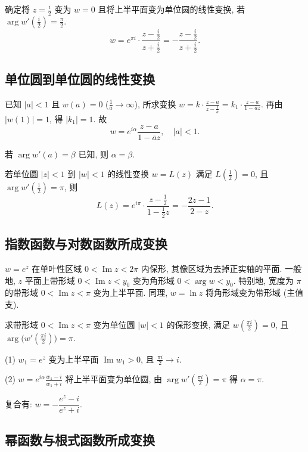\documentclass[theorem=false,mathfont=none,openany,sub3section]{easybook}
\begin{document}
\begin{example}
  确定将 $z=\frac{i}{2}$ 变为 $w=0$ 且将上半平面变为单位圆的线性变换, 若 $\arg w'(\frac{i}{2})=\frac{\pi}{2}$.
  \[
  w=e^{\pi i}\cdot\frac{z-\frac{i}{2}}{z+\frac{i}{2}}=-\frac{z-\frac{i}{2}}{z+\frac{i}{2}}.
  \]
\end{example}

\subsection{单位圆到单位圆的线性变换}

已知 $|a|<1$ 且 $w(a)=0$ ($\frac{1}{\overline{a}}\to\infty$),
所求变换 $w=k\cdot\frac{z-a}{z-\frac{1}{\overline{a}}}=k_{1}\cdot\frac{z-a}{1-\overline{a}z}$.
再由 $|w(1)|=1$, 得 $|k_{1}|=1$. 故
\[
w=e^{i\alpha}\frac{z-a}{1-\overline{a}z},\quad |a|<1.
\]

若 $\arg w'(a)=\beta$ 已知, 则 $\alpha=\beta$.

\begin{example}
  若单位圆 $|z|<1$ 到 $|w|<1$ 的线性变换 $w=L(z)$ 满足 $L(\frac{1}{2})=0$, 且 $\arg w'(\frac{1}{2})=\pi$, 则
  \[
  L(z)=e^{i\pi}\cdot\frac{z-\frac{1}{2}}{1-\frac{1}{2}z}=-\frac{2z-1}{2-z}.
  \]
\end{example}

\subsection{指数函数与对数函数所成变换}

$w=e^{z}$ 在单叶性区域 $0<\operatorname{Im}z<2\pi$ 内保形, 其像区域为去掉正实轴的平面.
一般地, $z$ 平面上带形域 $0<\operatorname{Im}z<y_{0}$ 变为角形域 $0<\arg w<y_{0}$.
特别地, 宽度为 $\pi$ 的带形域 $0<\operatorname{Im}z<\pi$ 变为上半平面.
同理, $w=\ln z$ 将角形域变为带形域 (主值支).

\begin{example}
  求带形域 $0<\operatorname{Im}z<\pi$ 变为单位圆 $|w|<1$ 的保形变换, 满足 $w(\frac{\pi i}{2})=0$, 且 $\arg\bigl(w'(\frac{\pi i}{2})\bigr)=\pi$.

  (1) $w_{1}=e^{z}$ 变为上半平面 $\operatorname{Im}w_{1}>0$, 且 $\frac{\pi i}{2}\to i$.\par
  (2) $w=e^{i\alpha}\frac{w_{1}-i}{w_{1}+i}$ 将上半平面变为单位圆, 由 $\arg w'(\frac{\pi i}{2})=\pi$ 得 $\alpha=\pi$.\par
  复合有: $w=-\dfrac{e^{z}-i}{e^{z}+i}$.
\end{example}

\subsection{幂函数与根式函数所成变换}
\end{document}
